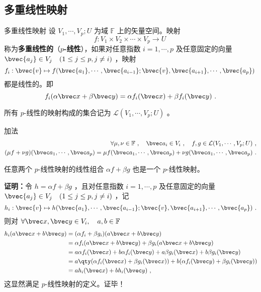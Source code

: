 \subsection{多重线性映射}
\begin{definition}{多重线性映射}
设 $V_1,\cdots,V_p;U$ 为域 $\mathbb{F}$ 上的矢量空间。映射
\begin{equation}
f:V_1\times V_2\times\cdots\times V_p\rightarrow U~
\end{equation}
称为\textbf{多重线性的}（\textbf{$p$-线性}），如果对任意指数 $i=1,\cdots,p$ 及任意固定的向量 $\bvec{a_j}\in V_j\quad(1\leq j\leq p,j\neq i)$ ，映射
\begin{equation}
f_i:\bvec{v}\mapsto f(\bvec{a_1},\cdots,\bvec{a_{i-1}};\bvec{v},\bvec{a_{i+1}},\cdots,\bvec{a_p})~
\end{equation}
都是线性的。即
\begin{equation}
f_i(\alpha\bvec x+\beta\bvec y)=\alpha f_i(\bvec x)+\beta f_i(\bvec y)~.
\end{equation}
\end{definition}
所有 $p$-线性的映射构成的集合记为 $\mathcal{L}(V_1,\cdots,V_p;U)$ 。
\begin{definition}{加法}
\begin{equation}
\begin{aligned}
\forall \mu,\nu\in\mathbb{F}~,\quad\bvec a_i\in V_i~,\quad f,g\in \mathcal{L}(V_1,\cdots,V_p;U)~,\\
(\mu f+\nu g)(\bvec a_1,\cdots,\bvec a_p)=\mu f(\bvec a_1,\cdots,\bvec a_p)+\nu g(\bvec a_1,\cdots,\bvec a_p)~.
\end{aligned}
\end{equation}
\end{definition}
\begin{theorem}{}\label{the_MulMap_1}
任意两个 $p$-线性映射的线性组合 $\alpha f+\beta g$ 也是一个 $p$-线性映射。
\end{theorem}
\textbf{证明：}令 $h=\alpha f+\beta g$ ，且对任意指数 $i=1,\cdots,p$ 及任意固定的向量 $\bvec{a_j}\in V_j\quad(1\leq j\leq p,j\neq i)$ ，记
\begin{equation}
h_i:\bvec{v}\mapsto h(\bvec{a_1},\cdots,\bvec{a_{i-1}};\bvec{v},\bvec{a_{i+1}},\cdots,\bvec{a_p})~.
\end{equation}
则对 $\forall \bvec x,\bvec y\in V_i,\quad a,b\in\mathbb{F}$
\begin{equation}
\begin{aligned}
h_i(a \bvec x+b\bvec y)&=(\alpha f_i+\beta g_i)(a \bvec x+b\bvec y)\\
&=\alpha f_i(a \bvec x+b\bvec y)+\beta g_i(a \bvec x+b\bvec y)\\
&=a\alpha f_i(\bvec x)+b\alpha f_i(\bvec y)+a\beta g_i(\bvec x)+b\beta g_i(\bvec y)\\
&=a\qty(\alpha f_i(\bvec x)+\beta g_i(\bvec x))+b(\alpha f_i(\bvec y)+\beta g_i(\bvec y))\\
&=ah_i(\bvec x)+bh_i(\bvec y)~,
\end{aligned}
\end{equation}
这显然满足 $p$-线性映射的定义。证毕！

